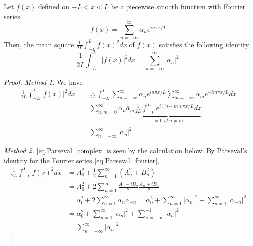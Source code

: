 \begin{theorem}
    Let $f(x)$ defined on $-L<x<L$ be a piecewise smooth function with Fourier series 
    \begin{equation}\label{eq.Parseval_complex_assumption}
        f(x)=\sum_{n=-\infty}^{\infty} \alpha_n e^{i n \pi x / L}
    \end{equation}
    Then, the mean square $\frac{1}{2 L} \int_{-L}^L f(x)^2 d x$ of $f(x)$ satisfies the following identity
    \begin{equation}\label{eq.Parseval_complex}
        \frac{1}{2 L} \int_{-L}^L |f(x)|^2 d x=\sum_{n=-\infty}^{\infty}\left|\alpha_n\right|^2 .
    \end{equation}
\end{theorem}
\begin{proof}
\textit{Method 1.} We have 
\begin{equation}\label{eq.proof_Parseval_complex_1}
    \begin{split}
        \frac{1}{2 L} \int_{-L}^L |f(x)|^2 d x 
        =& \frac{1}{2 L} \int_{-L}^L \sum_{n=-\infty}^{\infty} \alpha_n e^{i n \pi x / L} \sum_{m=-\infty}^{\infty} \bar{\alpha}_m e^{-i m \pi x / L} dx
        \\
        =& \sum_{n,m=0}^{\infty}\alpha_n\bar{\alpha}_m \underbrace{\frac{1}{2 L} \int_{-L}^L e^{i (n-m) \pi x / L} d x}_{= 0\textit{ if }n\neq m}
        \\
        =&\sum_{n=-\infty}^{\infty}\left|\alpha_n\right|^2
    \end{split}
\end{equation}
    

\textit{Method 2.} \eqref{eq.Parseval_complex} is seen by the calculation below. By Parseval's identity for the Fourier series \eqref{eq.Parseval_fourier},
$$
\begin{aligned}
\frac{1}{2 L} \int_{-L}^L f(x)^2 d x & =A_0^2+\frac{1}{2} \sum_{n=1}^{\infty}\left(A_n^2+B_n^2\right) \\
& =A_0^2+2 \sum_{n=1}^{\infty} \frac{A_n-i B_n}{2} \frac{A_n+i B_n}{2} \\
& =\alpha_0^2+2 \sum_{n=1}^{\infty} \alpha_n \alpha_{-n}=\alpha_0^2+\sum_{n=1}^{\infty}\left|\alpha_n\right|^2+\sum_{n=1}^{\infty}\left|\alpha_{-n}\right|^2 \\
& =\alpha_0^2+\sum_{n=1}^{\infty}\left|\alpha_n\right|^2+\sum_{n=-\infty}^{-1}\left|\alpha_n\right|^2 \\
& =\sum_{n=-\infty}^{\infty}\left|\alpha_n\right|^2
\end{aligned}
$$

\end{proof}

